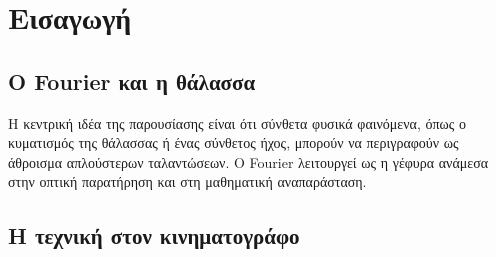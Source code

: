 \documentclass[a4paper, 11pt]{article}
\begin{document}


\begin{abstract}
Η παρουσίαση διερευνά πώς η θεωρία Fourier συνδέει τον ήχο, τα κύματα και τη σύγχρονη ψηφιακή προσομοίωση της θάλασσας. Αφετηρία αποτελούν παραδείγματα από τον κινηματογράφο και τα βιντεοπαιχνίδια, όπου οι επιφάνειες νερού δεν σχεδιάζονται κύμα-κύμα, αλλά προκύπτουν από φασματικά μοντέλα και αποδοτικούς αλγορίθμους.
Μέσα από αυτή τη διαδρομή, η θεωρία δεν παρουσιάζεται ως έτοιμο εργαλείο, αλλά αναδύεται φυσικά: από τα απλά κύματα και τη σύνθεση ήχων, στις μιγαδικές περιστροφές, τις αναπτύξεις Taylor και τον τύπο του Euler, μέχρι τους μετασχηματισμούς Fourier και την υπολογιστική τους υλοποίηση.
Η βασική ιδέα είναι ότι κάθε πολύπλοκο φαινόμενο μπορεί να αποσυντεθεί σε απλές ταλαντώσεις και να ανακατασκευαστεί από αυτές. Με αυτό το πρίσμα, παρουσιάζεται ένα πλήρες pipeline για ocean rendering: επιλογή ενεργειακού φάσματος, εισαγωγή τυχαίων φάσεων, εξέλιξη στο πεδίο συχνοτήτων και τελική ανακατασκευή της επιφάνειας μέσω IFFT.

Στο τέλος, η ψηφιακή θάλασσα δεν αποτελεί απλώς ένα οπτικό αποτέλεσμα, αλλά μια κατασκευή της οποίας μπορούμε να αναγνωρίσουμε τη δομή και την προέλευση κάθε κύματος.
\end{abstract}

\section{Εισαγωγή}\label{ux3b5ux3b9ux3c3ux3b1ux3b3ux3c9ux3b3ux3ae}

\subsection{Ο Fourier και η
θάλασσα}\label{ux3bf-fourier-ux3baux3b1ux3b9-ux3b7-ux3b8ux3acux3bbux3b1ux3c3ux3c3ux3b1}

Η κεντρική ιδέα της παρουσίασης είναι ότι σύνθετα φυσικά φαινόμενα, όπως
ο κυματισμός της θάλασσας ή ένας σύνθετος ήχος, μπορούν να περιγραφούν
ως άθροισμα απλούστερων ταλαντώσεων. Ο Fourier λειτουργεί ως η γέφυρα
ανάμεσα στην οπτική παρατήρηση και στη μαθηματική αναπαράσταση.

\subsection{Η τεχνική στον
κινηματογράφο}\label{ux3b7-ux3c4ux3b5ux3c7ux3bdux3b9ux3baux3ae-ux3c3ux3c4ux3bfux3bd-ux3baux3b9ux3bdux3b7ux3bcux3b1ux3c4ux3bfux3b3ux3c1ux3acux3c6ux3bf}
\end{document}
